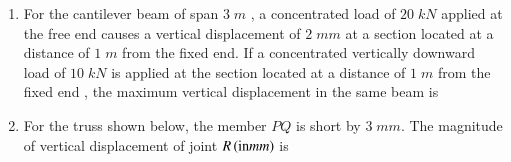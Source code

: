 \documentclass[journal,12pt,onecolumn]{IEEEtran}
\theoremstyle{remark}
\begin{document}
\begin{enumerate}[start=27]
\begin{enumerate}
\end{enumerate}
\item For the cantilever beam of span $3\;m$ , a concentrated load of $20\;kN$ applied at the free end causes a vertical displacement of $2\;mm$ at a section located at a distance of $1\;m$ from the fixed end. If a concentrated vertically downward load of $10\; kN$ is applied at the section located at a distance of $1\;m$ from the fixed end , the maximum vertical displacement in the same beam  is \underline{\hspace{2cm}}
	
\item For the truss shown below, the member $PQ$ is short by $3\;mm$. The magnitude of vertical displacement of joint $R\left(\text{in} mm\right)$ is \underline{\hspace{2cm}}\\
	



\end{enumerate}
\end{document}
